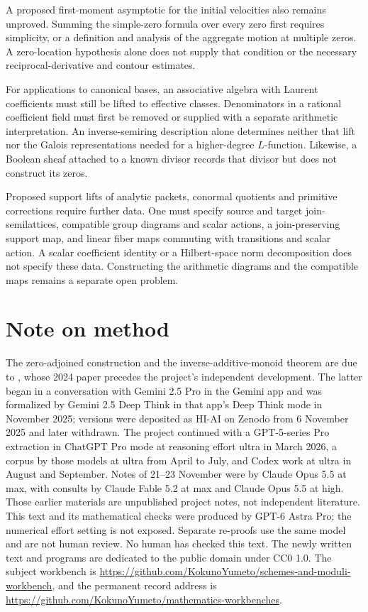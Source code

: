 \documentclass[11pt]{article}
\newcommand{\workbenchurl}{https://github.com/KokunoYumeto/schemes-and-moduli-workbench}
\newcommand{\recordurl}{https://github.com/KokunoYumeto/mathematics-workbenches}
\theoremstyle{definition}\newtheorem{definition}[theorem]{Definition}
\begin{document}
A proposed first-moment asymptotic for the initial velocities also remains unproved. Summing the simple-zero formula over every zero first requires simplicity, or a definition and analysis of the aggregate motion at multiple zeros. A zero-location hypothesis alone does not supply that condition or the necessary reciprocal-derivative and contour estimates.

For applications to canonical bases, an associative algebra with Laurent coefficients must still be lifted to effective classes. Denominators in a rational coefficient field must first be removed or supplied with a separate arithmetic interpretation. An inverse-semiring description alone determines neither that lift nor the Galois representations needed for a higher-degree $L$-function. Likewise, a Boolean sheaf attached to a known divisor records that divisor but does not construct its zeros.

Proposed support lifts of analytic packets, conormal quotients and primitive corrections require further data. One must specify source and target join-semilattices, compatible group diagrams and scalar actions, a join-preserving support map, and linear fiber maps commuting with transitions and scalar action. A scalar coefficient identity or a Hilbert-space norm decomposition does not specify these data. Constructing the arithmetic diagrams and the compatible maps remains a separate open problem.

\section*{Note on method}
The zero-adjoined construction and the inverse-additive-monoid theorem are due to \citet[Definition 3.6 and Proposition 6.1]{FGJM}, whose 2024 paper precedes the project's independent development. The latter began in a conversation with Gemini 2.5 Pro in the Gemini app and was formalized by Gemini 2.5 Deep Think in that app's Deep Think mode in November 2025; versions were deposited as HI-AI on Zenodo from 6 November 2025 and later withdrawn. The project continued with a GPT-5-series Pro extraction in ChatGPT Pro mode at reasoning effort ultra in March 2026, a corpus by those models at ultra from April to July, and Codex work at ultra in August and September. Notes of 21--23 November were by Claude Opus 5.5 at max, with consults by Claude Fable 5.2 at max and Claude Opus 5.5 at high. Those earlier materials are unpublished project notes, not independent literature. This text and its mathematical checks were produced by GPT-6 Astra Pro; the numerical effort setting is not exposed. Separate re-proofs use the same model and are not human review. No human has checked this text. The newly written text and programs are dedicated to the public domain under CC0 1.0. The subject workbench is \url{\workbenchurl}, and the permanent record address is \url{\recordurl}.
\end{document}
